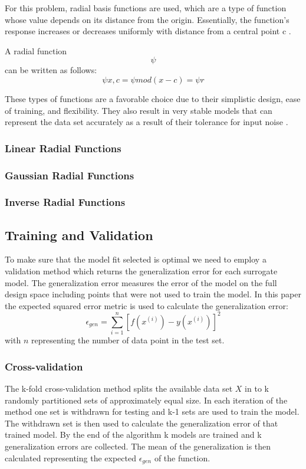 \documentclass[conf]{new-aiaa}
\begin{document}
For this problem, radial basis functions are used, which are a type of function whose value depends on its distance from the origin. Essentially, the function's response increases or decreases uniformly with distance from a central point c \cite{orr1996introduction}. 

A radial function \[\psi\] can be written as follows:
\[\psi{x,c}=\psi{mod(x-c)}=\psi{r}\]


These types of functions are a favorable choice due to their simplistic design, ease of training, and flexibility.  They also result in very stable models that can represent the data set accurately as a result of their tolerance for input noise \cite{yu2011advantages}.

\subsubsection{Linear Radial Functions}


\subsubsection{Gaussian Radial Functions}


\subsubsection{Inverse Radial Functions}



\subsection{Training and Validation} %
To make sure that the model fit selected is optimal we need to employ a validation method which returns the generalization error for each surrogate model. The generalization error measures the error of the model on the full design space including points that were not used to train the model. In this paper the expected squared error metric is used to calculate the generalization error:
\[\epsilon_{gen} = \sum_{i=1}^{n} [f(x^{(i)})-y(x^{(i)})]^2\]
with $n$ representing the number of data point in the test set.

\subsubsection{Cross-validation}
The k-fold cross-validation method splits the available data set $X$ in to k randomly partitioned sets of approximately equal size. In each iteration of the method one set is withdrawn for testing and k-1 sets are used to train the model. The withdrawn set is then used to calculate the generalization error of that trained model. By the end of the algorithm k models are trained and k generalization errors are collected. The mean of the generalization is then calculated representing the expected $\epsilon_{gen}$ of the function.
\end{document}
